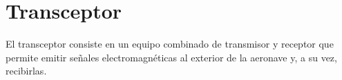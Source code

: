 
\section{Transceptor}
\label{sec:comunicaciones.a.bordo.transceptor}

El transceptor consiste en un equipo combinado de transmisor y receptor que permite emitir se\~nales electromagn\'eticas al exterior de la aeronave y, a su vez, recibirlas.


